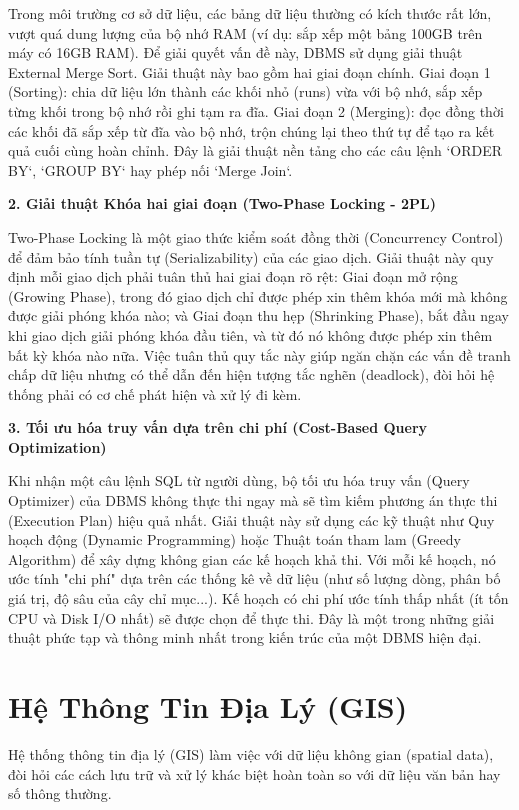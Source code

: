 \documentclass[a4paper,12pt]{article}
\begin{document}
Trong môi trường cơ sở dữ liệu, các bảng dữ liệu thường có kích thước rất lớn, vượt quá dung lượng của bộ nhớ RAM (ví dụ: sắp xếp một bảng 100GB trên máy có 16GB RAM). Để giải quyết vấn đề này, DBMS sử dụng giải thuật External Merge Sort. Giải thuật này bao gồm hai giai đoạn chính. Giai đoạn 1 (Sorting): chia dữ liệu lớn thành các khối nhỏ (runs) vừa với bộ nhớ, sắp xếp từng khối trong bộ nhớ rồi ghi tạm ra đĩa. Giai đoạn 2 (Merging): đọc đồng thời các khối đã sắp xếp từ đĩa vào bộ nhớ, trộn chúng lại theo thứ tự để tạo ra kết quả cuối cùng hoàn chỉnh. Đây là giải thuật nền tảng cho các câu lệnh `ORDER BY`, `GROUP BY` hay phép nối `Merge Join`.

\textbf{2. Giải thuật Khóa hai giai đoạn (Two-Phase Locking - 2PL)}

Two-Phase Locking là một giao thức kiểm soát đồng thời (Concurrency Control) để đảm bảo tính tuần tự (Serializability) của các giao dịch. Giải thuật này quy định mỗi giao dịch phải tuân thủ hai giai đoạn rõ rệt: Giai đoạn mở rộng (Growing Phase), trong đó giao dịch chỉ được phép xin thêm khóa mới mà không được giải phóng khóa nào; và Giai đoạn thu hẹp (Shrinking Phase), bắt đầu ngay khi giao dịch giải phóng khóa đầu tiên, và từ đó nó không được phép xin thêm bất kỳ khóa nào nữa. Việc tuân thủ quy tắc này giúp ngăn chặn các vấn đề tranh chấp dữ liệu nhưng có thể dẫn đến hiện tượng tắc nghẽn (deadlock), đòi hỏi hệ thống phải có cơ chế phát hiện và xử lý đi kèm.

\textbf{3. Tối ưu hóa truy vấn dựa trên chi phí (Cost-Based Query Optimization)}

Khi nhận một câu lệnh SQL từ người dùng, bộ tối ưu hóa truy vấn (Query Optimizer) của DBMS không thực thi ngay mà sẽ tìm kiếm phương án thực thi (Execution Plan) hiệu quả nhất. Giải thuật này sử dụng các kỹ thuật như Quy hoạch động (Dynamic Programming) hoặc Thuật toán tham lam (Greedy Algorithm) để xây dựng không gian các kế hoạch khả thi. Với mỗi kế hoạch, nó ước tính "chi phí" dựa trên các thống kê về dữ liệu (như số lượng dòng, phân bố giá trị, độ sâu của cây chỉ mục...). Kế hoạch có chi phí ước tính thấp nhất (ít tốn CPU và Disk I/O nhất) sẽ được chọn để thực thi. Đây là một trong những giải thuật phức tạp và thông minh nhất trong kiến trúc của một DBMS hiện đại.

\section{Hệ Thông Tin Địa Lý (GIS)}

Hệ thống thông tin địa lý (GIS) làm việc với dữ liệu không gian (spatial data), đòi hỏi các cách lưu trữ và xử lý khác biệt hoàn toàn so với dữ liệu văn bản hay số thông thường.
\end{document}
